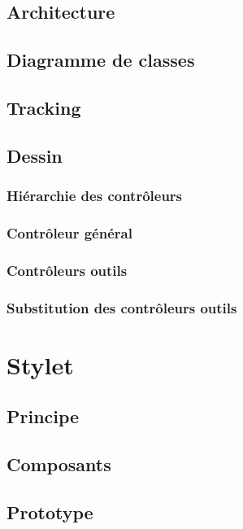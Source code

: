 \documentclass[11pt,a4paper,oldfontcommands]{memoir}
\begin{document}
\subsection{Architecture}

\subsection{Diagramme de classes}

\subsection{Tracking}

\subsection{Dessin}

\subsubsection{Hiérarchie des contrôleurs}

\subsubsection{Contrôleur général}

\subsubsection{Contrôleurs outils}

\subsubsection{Substitution des contrôleurs outils}

\section{Stylet}
\label{sec:stylet}

\subsection{Principe}

\subsection{Composants}

\subsection{Prototype}
\end{document}
